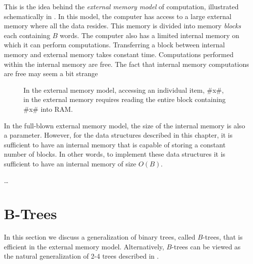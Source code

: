 
This is the idea behind the \emph{external memory model} of computation,
illustrated schematically in .  In this model, the computer
has access to a large external memory where all the data resides.
This memory is divided into memory \emph{blocks} each containing $B$
words.  The computer also has a limited internal memory on which it can
perform computations.  Transferring a block between internal memory and
external memory takes constant time.  Computations performed within the
internal memory are free.  The fact that internal memory computations
are free may seem a bit strange

\begin{figure}
  \caption{In the external memory model, accessing an individual item,
  #x#, in the external memory requires reading the entire block containing
  #x# into RAM.}
\end{figure}

In the full-blown external memory model, the size of the internal memory
is also a parameter.  However, for the data structures described in this
chapter, it is sufficient to have an internal memory that is capable
of storing a constant number of blocks.  In other words, to implement
these data structures it is sufficient to have an internal memory of
size $O(B)$.

\ldots

\section{B-Trees}

In this section we discuss a generalization of binary trees, called
$B$-trees, that is efficient in the external memory model.  Alternatively, $B$-trees can be viewed as the natural generalization of 2-4 trees described in .


